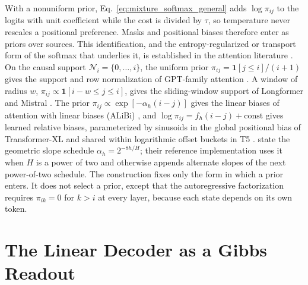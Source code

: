 \documentclass[twoside,11pt]{article}
\begin{document}
With a nonuniform prior, Eq.~\eqref{eq:mixture_softmax_general} adds $\log\pi_{ij}$ to the logits with unit coefficient while the cost is divided by $\tau$, so temperature never rescales a positional preference. Masks and positional biases therefore enter as priors over sources. This identification, and the entropy-regularized or transport form of the softmax that underlies it, is established in the attention literature \citep{Niculae2017Regularized,Litman2025EOT,Bianchessi2026BAM,Litman2026AttentionPriors}. On the causal support $\mathcal N_i=\{0,\ldots,i\}$, the uniform prior $\pi_{ij}=\mathbf{1}[j\le i]/(i+1)$ gives the support and row normalization of GPT-family attention \citep{radford2019language}. A window of radius $w$, $\pi_{ij}\propto\mathbf{1}[i-w\le j\le i]$, gives the sliding-window support of Longformer and Mistral \citep{beltagy2020longformer,jiang2023mistral}. The prior $\pi_{ij}\propto\exp[-\alpha_h(i-j)]$ gives the linear biases of attention with linear biases (ALiBi) \citep{press2022train}, and $\log\pi_{ij}=f_h(i-j)+\mathrm{const}$ gives learned relative biases, parameterized by sinusoids in the global positional bias of Transformer-XL and shared within logarithmic offset buckets in T5 \citep{dai2019transformerxl,raffel2020exploring}. \citet{press2022train} state the geometric slope schedule $\alpha_h=2^{-8h/H}$; their reference implementation uses it when $H$ is a power of two and otherwise appends alternate slopes of the next power-of-two schedule. The construction fixes only the form in which a prior enters. It does not select a prior, except that the autoregressive factorization requires $\pi_{ik}=0$ for $k>i$ at every layer, because each state depends on its own token.


\section{The Linear Decoder as a Gibbs Readout}
\label{app:decoder_readout}
\end{document}
